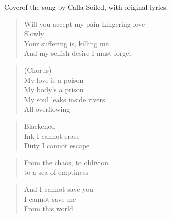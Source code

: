 

Coverof the song by Calla Soiled, with original lyrics.

\begin{minipage}{0.6\textwidth}
    \begin{verse}
    Will you accept my pain
    Lingering love \\
    Slowly \\
    Your suffering is, killing me \\
    And my selfish desire I must forget
    \end{verse}

    \begin{verse}
    (Chorus) \\
    My love is a poison \\
    My body's a prison \\
    My soul leaks inside rivers \\
    All overflowing
    \end{verse}

    \begin{verse}
    Blackened \\
    Ink I cannot erase \\
    Duty I cannot escape
    \end{verse}

    \begin{verse}
    From the chaos, to oblivion \\
    to a sea of emptiness
    \end{verse}

    \begin{verse}
    And I cannot save you \\
    I cannot save me \\
    From this world
    \end{verse}

\end{minipage}
\clearpage
